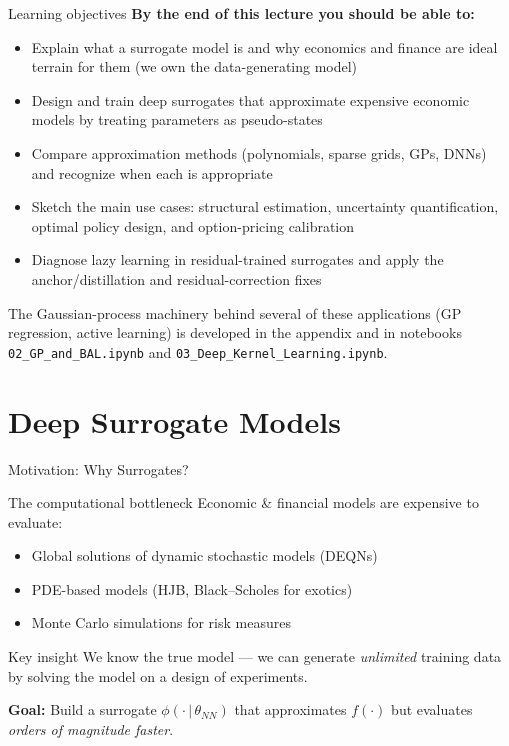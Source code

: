 \documentclass[aspectratio=169,11pt]{beamer}
\newcommand{\emphc}[1]{\textcolor{harvardcrimson}{#1}}
\begin{document}
\begin{frame}{Learning objectives}
\textbf{By the end of this lecture you should be able to:}
\begin{itemize}
  \item Explain what a surrogate model is and why economics and finance are ideal terrain for them (we own the data-generating model)
  \item Design and train deep surrogates that approximate expensive economic models by treating parameters as pseudo-states
  \item Compare approximation methods (polynomials, sparse grids, GPs, DNNs) and recognize when each is appropriate
  \item Sketch the main use cases: structural estimation, uncertainty quantification, optimal policy design, and option-pricing calibration
  \item Diagnose \emphc{lazy learning} in residual-trained surrogates and apply the anchor/distillation and residual-correction fixes
\end{itemize}
\vspace{0.3em}
{\small The Gaussian-process machinery behind several of these applications (GP regression, active learning) is developed in the \emphc{appendix} and in notebooks \texttt{02\_GP\_and\_BAL.ipynb} and \texttt{03\_Deep\_Kernel\_Learning.ipynb}.}
\end{frame}


\section{Deep Surrogate Models}

\begin{frame}{Motivation: Why Surrogates?}
\begin{block}{The computational bottleneck}
Economic \& financial models are expensive to evaluate:
\begin{itemize}
  \item Global solutions of dynamic stochastic models (DEQNs)
  \item PDE-based models (HJB, Black--Scholes for exotics)
  \item Monte Carlo simulations for risk measures
\end{itemize}
\end{block}

\vspace{0.3cm}
\begin{alertblock}{Key insight}
\emphc{We know the true model} --- we can generate \emph{unlimited} training data by solving the model on a design of experiments.
\end{alertblock}

\vspace{0.3cm}
\textbf{Goal:} Build a \emphc{surrogate} $\phi(\cdot\,|\,\theta_{NN})$ that approximates $f(\cdot)$ but evaluates \emph{orders of magnitude faster}.
\end{frame}
\end{document}

